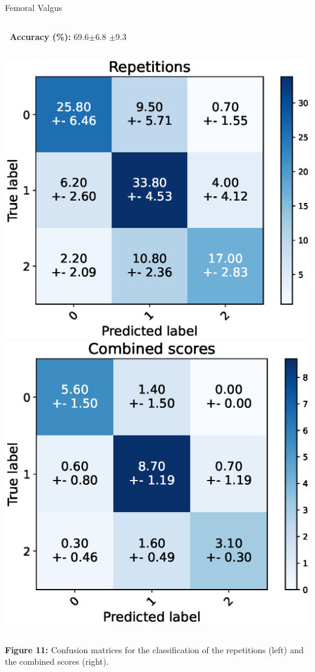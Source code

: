 \begin{frame}[fragile]{Femoral Valgus}
  \begin{columns}
    \textbf{\small~Accuracy (\%):} 69.6$\pm$6.8
    \vspace{0.3cm}
    $\pm$9.3
    \vspace{0.3cm}
  \end{columns}
  \begin{columns}
    \centering
    \includegraphics[width=\textwidth]{files/figs/res/femval/cnf-reps.eps}
    \centering
    \includegraphics[width=\textwidth]{files/figs/res/femval/cnf-combined.eps}
  \end{columns}
  {\scriptsize\newline\textbf{Figure 11:} Confusion matrices for the classification of the repetitions (left) and the combined scores (right).}
\end{frame}

